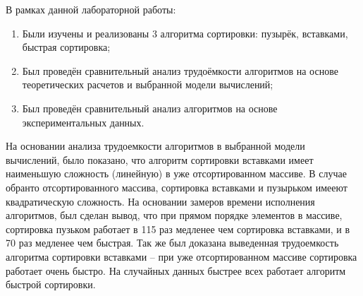 \documentclass[12pt]{report}
\begin{document}
В рамках данной лабораторной работы:

\begin{enumerate}
	\item Были изучены и реализованы 3 алгоритма сортировки: пузырёк, вставками, быстрая сортировка;
	\item Был проведён сравнительный анализ трудоёмкости алгоритмов на основе теоретических расчетов и выбранной модели вычислений;
	\item Был проведён сравнительный анализ алгоритмов на основе экспериментальных данных.
\end{enumerate}

На основании анализа трудоемкости алгоритмов в выбранной модели вычислений, было показано, что алгоритм сортировки вставками имеет наименьшую сложность (линейную) в уже отсортированном массиве. В случае обранто отсортированного массива, сортировка вставками и пузырьком имееют квадратическую сложность. На основании замеров времени исполнения алгоритмов, был сделан вывод, что при прямом порядке элементов в массиве, сортировка пузьком работает в 115 раз медленее чем сортировка вставками, и в 70 раз медленее чем быстрая. Так же был доказана выведенная трудоемкость алгоритма сортировки вставками -- при  уже отсортированном массиве сортировка работает очень быстро. На случайных данных быстрее всех работает алгоритм быстрой сортировки.




\end{document}

